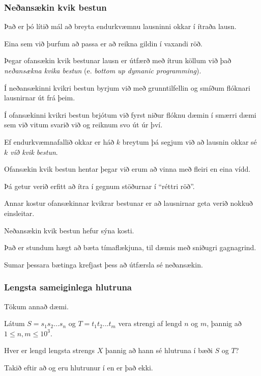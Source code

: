 {
    \frametitle{Neðansækin kvik bestun}
    {
        \item<1-> Það er þó lítið mál að breyta endurkvæmnu lausninni okkar í ítraða lausn.
            \item<2-> Eina sem við þurfum að passa er að reikna gildin í vaxandi röð.
            \item<3->[]
        \item<4-> Þegar ofansækin kvik bestunar lausn er útfærð með ítrun köllum við það \emph{neðansækna kvika bestun} 
        (e. \emph{bottom up dymanic programming}).
    }
}

{
    {
        \item<1-> Í neðansækinni kvikri bestun byrjum við með grunntilfellin og smíðum flóknari lausnirnar út frá þeim.
            \item<2-> Í ofansækinni kvikri bestun brjótum við fyrst niður flóknu dæmin í smærri dæmi sem við vitum svarið við og reiknum svo út úr því.
            \item<3-> Ef endurkvæmnafallið okkar er háð $k$ breytum þá segjum við að lausnin okkar sé \emph{$k$ víð kvik bestun}.
            \item<4-> Ofansækin kvik bestun hentar þegar við erum að vinna með fleiri en eina vídd.
            \item<5-> Þá getur verið erfitt að ítra í gegnum stöðurnar í ``réttri röð''.
    }
}

{
    {
        \item<1-> Annar kostur ofansækinnar kvikrar bestunar er að lausnirnar geta verið nokkuð einsleitar.
            \item<2->[] 
    }
}

{
    {
        \item<1-> Neðansækin kvik bestun hefur sýna kosti.
            \item<2-> Það er stundum hægt að bæta tímaflækjuna, til dæmis með sniðugri gagnagrind.
            \item<3-> Sumar þessara bætinga krefjast þess að útfærsla sé neðansækin.
    }
}

{
    \frametitle{Lengsta sameiginlega hlutruna}
    {
        \item<1-> Tökum annað dæmi.
            \item<2-> Látum $S = s_1s_2...s_n$ og $T = t_1t_2...t_m$ vera strengi af lengd $n$ og $m$, þannig að $1 \leq n, m \leq 10^3$.
            \item<3-> Hver er lengd lengsta strengs $X$ þannig að hann sé hlutruna í bæði $S$ og $T$?
            \item<4-> Takið eftir að  og  eru hlutrunur í  en  er það ekki.
    }
}

